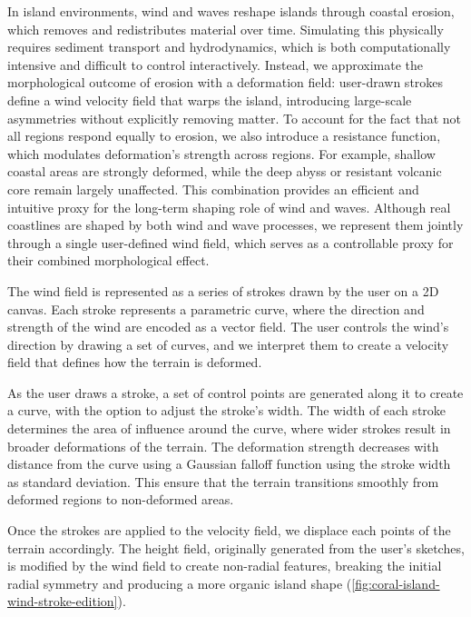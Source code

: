 In island environments, wind and waves reshape islands through coastal erosion, which removes and redistributes material over time. Simulating this physically requires sediment transport and hydrodynamics, which is both computationally intensive and difficult to control interactively. Instead, we approximate the morphological outcome of erosion with a deformation field: user-drawn strokes define a wind velocity field that warps the island, introducing large-scale asymmetries without explicitly removing matter. To account for the fact that not all regions respond equally to erosion, we also introduce a resistance function, which modulates deformation's strength across regions. For example, shallow coastal areas are strongly deformed, while the deep abyss or resistant volcanic core remain largely unaffected. This combination provides an efficient and intuitive proxy for the long-term shaping role of wind and waves.
Although real coastlines are shaped by both wind and wave processes, we represent them jointly through a single user-defined wind field, which serves as a controllable proxy for their combined morphological effect.

The wind field is represented as a series of strokes drawn by the user on a 2D canvas. Each stroke represents a parametric curve, where the direction and strength of the wind are encoded as a vector field. The user controls the wind's direction by drawing a set of curves, and we interpret them to create a velocity field that defines how the terrain is deformed.

As the user draws a stroke, a set of control points are generated along it to create a curve, with the option to adjust the stroke's width. The width of each stroke determines the area of influence around the curve, where wider strokes result in broader deformations of the terrain.
The deformation strength decreases with distance from the curve using a Gaussian falloff function using the stroke width as standard deviation. This ensure that the terrain transitions smoothly from deformed regions to non-deformed areas.

Once the strokes are applied to the velocity field, we displace each points of the terrain accordingly. The height field, originally generated from the user's sketches, is modified by the wind field to create non-radial features, breaking the initial radial symmetry and producing a more organic island shape (\cref{fig:coral-island-wind-stroke-edition}).


